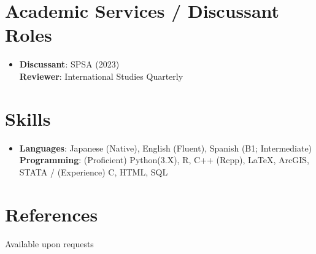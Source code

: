 \documentclass[letterpaper,11pt]{article} %
\makeatletter
\newcommand{\CVSubheading}[4]{
  \vspace{-2pt}\item
    \begin{tabular*}{0.97\textwidth}[t]{l@{\extracolsep{\fill}}r}
      \textbf{#1} & #2 \\
      \small#3 & \small #4 \\
    \end{tabular*}\vspace{-7pt}
}
\newcommand{\CVSubHeadingListStart}{\begin{itemize}[leftmargin=0.5cm, label={}]}
\newcommand{\CVSubHeadingListEnd}{\end{itemize}}
\makeatother
\begin{document}

\section{Academic Services / Discussant Roles}
\begin{itemize}[leftmargin=0.5cm, label={}]
  \item{
    \textbf{Discussant}: SPSA (2023) \\
    \textbf{Reviewer}: International Studies Quarterly
  }
\end{itemize}


\begin{comment}
This section is compressed from the various skills sections that Euro CV
recommends.
\end{comment}

\section{Skills}
\begin{itemize}[leftmargin=0.5cm, label={}]
    \item{
     \textbf{Languages}{: Japanese (Native), English (Fluent), Spanish (B1; Intermediate)} \\
     \textbf{Programming}{: (Proficient) Python(3.X), R, C++ (Rcpp), \LaTeX, ArcGIS, STATA / (Experience) C, HTML, SQL}
    }
\end{itemize}

\section{References}
Available upon requests

\end{document}
